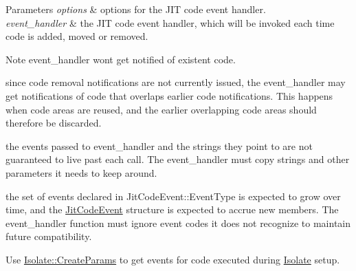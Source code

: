 \begin{DoxyParams}{Parameters}
{\em options} & options for the J\+I\+T code event handler. \\
\hline
{\em event\+\_\+handler} & the J\+I\+T code event handler, which will be invoked each time code is added, moved or removed. \\
\hline
\end{DoxyParams}
\begin{DoxyNote}{Note}
{\ttfamily event\+\_\+handler} won\textquotesingle{}t get notified of existent code. 

since code removal notifications are not currently issued, the {\ttfamily event\+\_\+handler} may get notifications of code that overlaps earlier code notifications. This happens when code areas are reused, and the earlier overlapping code areas should therefore be discarded. 

the events passed to {\ttfamily event\+\_\+handler} and the strings they point to are not guaranteed to live past each call. The {\ttfamily event\+\_\+handler} must copy strings and other parameters it needs to keep around. 

the set of events declared in Jit\+Code\+Event\+::\+Event\+Type is expected to grow over time, and the \hyperlink{structv8_1_1JitCodeEvent}{Jit\+Code\+Event} structure is expected to accrue new members. The {\ttfamily event\+\_\+handler} function must ignore event codes it does not recognize to maintain future compatibility. 

Use \hyperlink{structv8_1_1Isolate_1_1CreateParams}{Isolate\+::\+Create\+Params} to get events for code executed during \hyperlink{classv8_1_1Isolate}{Isolate} setup. 
\end{DoxyNote}
\hypertarget{classv8_1_1Isolate_ae4418cb238686a321aa406e90c72fab5}{}
